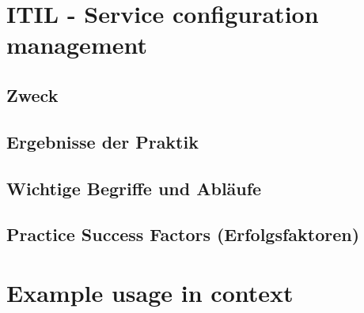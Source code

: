 \section{ITIL - Service configuration management}

\subsection{Zweck}
\subsection{Ergebnisse der Praktik}
\subsection{Wichtige Begriffe und Abläufe}
\subsection{Practice Success Factors (Erfolgsfaktoren)}

\section{Example usage in context}
